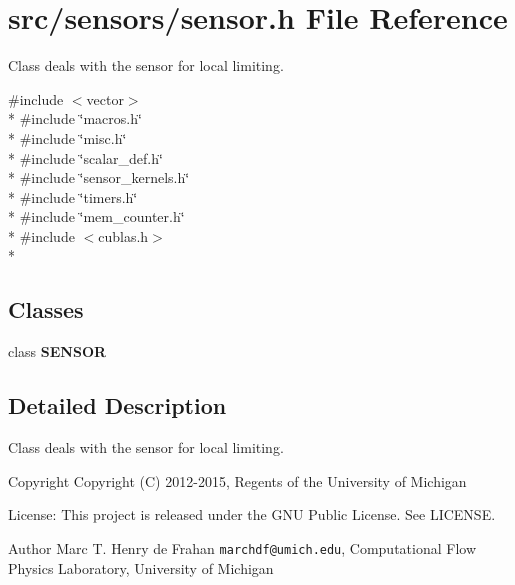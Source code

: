 \section{src/sensors/sensor.h File Reference}
\label{sensor_8h}


Class deals with the sensor for local limiting.  


{\ttfamily \#include $<$vector$>$}\\*
{\ttfamily \#include \char`\"{}macros.\-h\char`\"{}}\\*
{\ttfamily \#include \char`\"{}misc.\-h\char`\"{}}\\*
{\ttfamily \#include \char`\"{}scalar\-\_\-def.\-h\char`\"{}}\\*
{\ttfamily \#include \char`\"{}sensor\-\_\-kernels.\-h\char`\"{}}\\*
{\ttfamily \#include \char`\"{}timers.\-h\char`\"{}}\\*
{\ttfamily \#include \char`\"{}mem\-\_\-counter.\-h\char`\"{}}\\*
{\ttfamily \#include $<$cublas.\-h$>$}\\*
\subsection*{Classes}
\begin{DoxyCompactItemize}
\item 
class {\bf S\-E\-N\-S\-O\-R}
\end{DoxyCompactItemize}


\subsection{Detailed Description}
Class deals with the sensor for local limiting. \begin{DoxyCopyright}{Copyright}
Copyright (C) 2012-\/2015, Regents of the University of Michigan 
\end{DoxyCopyright}
\begin{DoxyParagraph}{License\-:}
This project is released under the G\-N\-U Public License. See L\-I\-C\-E\-N\-S\-E. 
\end{DoxyParagraph}
\begin{DoxyAuthor}{Author}
Marc T. Henry de Frahan {\tt marchdf@umich.\-edu}, Computational Flow Physics Laboratory, University of Michigan 
\end{DoxyAuthor}
